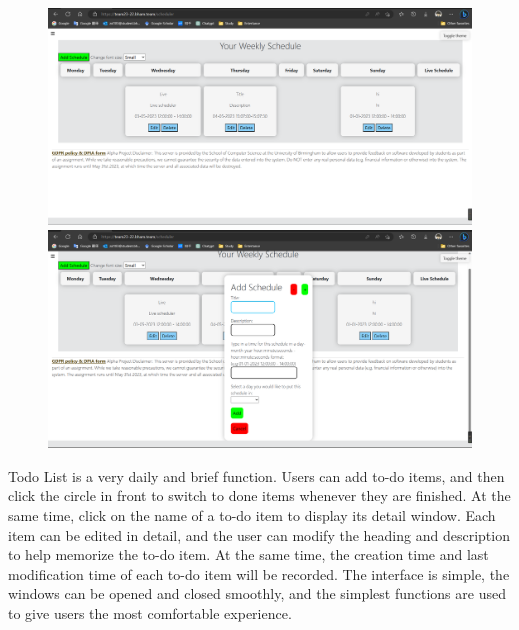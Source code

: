 \documentclass[a4paper]{article}
\begin{document}
\begin{figure}[H]
  \centering
  \begin{minipage}{0.49\textwidth}
    \centering
    \includegraphics[width=\linewidth]{./image/Screenshot 2023-05-03 153828.png}
  \end{minipage}\hfill
  \begin{minipage}{0.49\textwidth}
    \centering
    \includegraphics[width=\linewidth]{./image/Screenshot 2023-05-03 153847.png}
  \end{minipage}
\end{figure}


Todo List is a very daily and brief function. Users can add to-do items, and then click the circle in front to switch to done items whenever they are finished. At the same time, click on the name of a to-do item to display its detail window. Each item can be edited in detail, and the user can modify the heading and description to help memorize the to-do item. At the same time, the creation time and last modification time of each to-do item will be recorded. The interface is simple, the windows can be opened and closed smoothly, and the simplest functions are used to give users the most comfortable experience.
\end{document}
